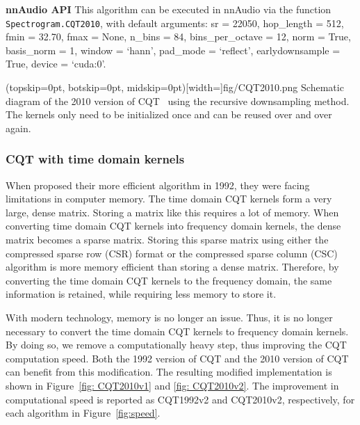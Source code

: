 \documentclass{ieeeaccess}
\newcommand{\nbh}[1]{\texttt{#1}}
\begin{document}
\hspace{11pt} 

\noindent \textbf{nnAudio API} This algorithm can be executed in nnAudio via the function \nbh{Spectrogram.CQT2010}, with default arguments: sr = 22050, hop\_length = 512, fmin = 32.70, fmax = None, n\_bins = 84, bins\_per\_octave = 12, norm = True, basis\_norm = 1, window = `hann', pad\_mode = `reflect', earlydownsample = True, device = `cuda:0'.

\Figure(topskip=0pt, botskip=0pt, midskip=0pt)[width=\linewidth]{fig/CQT2010.png}
{Schematic diagram of the 2010 version of CQT~\cite{schorkhuber2010constant, brown1991calculation} using the recursive downsampling method. The kernels  only need to be initialized once and can be reused over and over again. \label{fig: CQT2010}}




\subsubsection{CQT with time domain kernels}
\label{subsec:CQTv2}
When \citet{brown1992efficient} proposed their more efficient algorithm in 1992, they were facing limitations in computer memory. The time domain CQT kernels form a very large, dense matrix. Storing a matrix like this requires a lot of memory. When converting time domain CQT kernels into frequency domain kernels, the dense matrix becomes a sparse matrix. Storing this sparse matrix using either the compressed sparse row (CSR) format or the compressed sparse column (CSC) algorithm is more memory efficient than storing a dense matrix. Therefore, by converting the time domain CQT kernels to the frequency domain, the same information is retained, while requiring less memory to store it.

With modern technology, memory is no longer an issue. Thus, it is no longer necessary to convert the time domain CQT kernels to frequency domain kernels. By doing so, we remove a computationally heavy step, thus improving the CQT computation speed. Both the 1992 version of CQT and the 2010 version of CQT can benefit from this modification. The resulting modified implementation is shown in Figure~\ref{fig: CQT2010v1} and \ref{fig: CQT2010v2}. The improvement in computational speed is reported as CQT1992v2 and CQT2010v2, respectively, for each algorithm in Figure~\ref{fig:speed}.



\hspace{11pt} 
\end{document}
